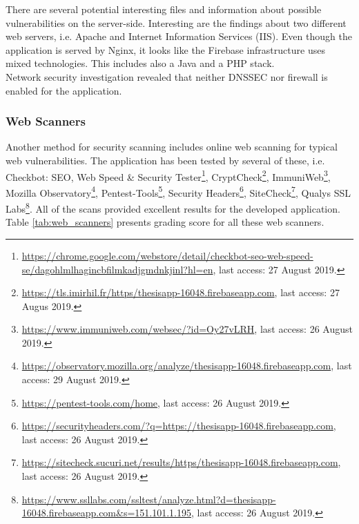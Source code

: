 \documentclass{article} %
\begin{document}
There are several potential interesting files and information about possible vulnerabilities on the server-side. Interesting are the findings about two different web servers, i.e. Apache and Internet Information Services (IIS). Even though the application is served by Nginx, it looks like the Firebase infrastructure uses mixed technologies. This includes also a Java and a PHP stack.\\
\newline
Network security investigation revealed that neither DNSSEC nor firewall is enabled for the application.
\subsubsection{Web Scanners}
Another method for security scanning includes online web scanning for typical web vulnerabilities. The application has been tested by several of these, i.e. Checkbot: SEO, Web Speed \& Security Tester\footnote{\url{https://chrome.google.com/webstore/detail/checkbot-seo-web-speed-se/dagohlmlhagincbfilmkadjgmdnkjinl?hl=en}, last access: 27 August 2019.}, CryptCheck\footnote{\url{https://tls.imirhil.fr/https/thesisapp-16048.firebaseapp.com}, last access: 27 Augus 2019.}, ImmuniWeb\footnote{\url{https://www.immuniweb.com/websec/?id=Oy27vLRH}, last access: 26 August 2019.}, Mozilla Observatory\footnote{\url{https://observatory.mozilla.org/analyze/thesisapp-16048.firebaseapp.com}, last access: 29 August 2019.}, Pentest-Tools\footnote{\url{https://pentest-tools.com/home}, last access: 26 August 2019.}, Security Headers\footnote{\url{https://securityheaders.com/?q=https://thesisapp-16048.firebaseapp.com}, last access: 26 August 2019.}, SiteCheck\footnote{\url{https://sitecheck.sucuri.net/results/https/thesisapp-16048.firebaseapp.com}, last access: 26 August 2019.}, Qualys SSL Labs\footnote{\url{https://www.ssllabs.com/ssltest/analyze.html?d=thesisapp-16048.firebaseapp.com&s=151.101.1.195}, last access: 26 August 2019.}. All of the scans provided excellent results for the developed application. Table \ref{tab:web_scanners} presents grading score for all these web scanners.
\end{document}
